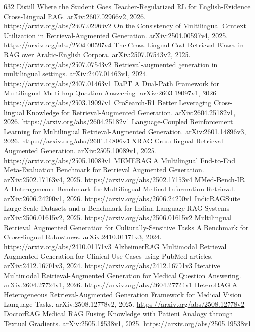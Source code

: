 \documentclass[11pt]{article}
\begin{document}
\begin{thebibliography}{632}
 Distill Where the Student Goes Teacher-Regularized RL for English-Evidence Cross-Lingual RAG. arXiv:2607.02966v2, 2026. \url{https://arxiv.org/abs/2607.02966v2}
 On the Consistency of Multilingual Context Utilization in Retrieval-Augmented Generation. arXiv:2504.00597v4, 2025. \url{https://arxiv.org/abs/2504.00597v4}
 The Cross-Lingual Cost Retrieval Biases in RAG over Arabic-English Corpora. arXiv:2507.07543v2, 2025. \url{https://arxiv.org/abs/2507.07543v2}
 Retrieval-augmented generation in multilingual settings. arXiv:2407.01463v1, 2024. \url{https://arxiv.org/abs/2407.01463v1}
 DaPT A Dual-Path Framework for Multilingual Multi-hop Question Answering. arXiv:2603.19097v1, 2026. \url{https://arxiv.org/abs/2603.19097v1}
 CroSearch-R1 Better Leveraging Cross-lingual Knowledge for Retrieval-Augmented Generation. arXiv:2604.25182v1, 2026. \url{https://arxiv.org/abs/2604.25182v1}
 Language-Coupled Reinforcement Learning for Multilingual Retrieval-Augmented Generation. arXiv:2601.14896v3, 2026. \url{https://arxiv.org/abs/2601.14896v3}
 XRAG Cross-lingual Retrieval-Augmented Generation. arXiv:2505.10089v1, 2025. \url{https://arxiv.org/abs/2505.10089v1}
 MEMERAG A Multilingual End-to-End Meta-Evaluation Benchmark for Retrieval Augmented Generation. arXiv:2502.17163v4, 2025. \url{https://arxiv.org/abs/2502.17163v4}
 MMed-Bench-IR A Heterogeneous Benchmark for Multilingual Medical Information Retrieval. arXiv:2606.24200v1, 2026. \url{https://arxiv.org/abs/2606.24200v1}
 IndicRAGSuite Large-Scale Datasets and a Benchmark for Indian Language RAG Systems. arXiv:2506.01615v2, 2025. \url{https://arxiv.org/abs/2506.01615v2}
 Multilingual Retrieval Augmented Generation for Culturally-Sensitive Tasks A Benchmark for Cross-lingual Robustness. arXiv:2410.01171v3, 2024. \url{https://arxiv.org/abs/2410.01171v3}
 AlzheimerRAG Multimodal Retrieval Augmented Generation for Clinical Use Cases using PubMed articles. arXiv:2412.16701v3, 2024. \url{https://arxiv.org/abs/2412.16701v3}
 Iterative Multimodal Retrieval-Augmented Generation for Medical Question Answering. arXiv:2604.27724v1, 2026. \url{https://arxiv.org/abs/2604.27724v1}
 HeteroRAG A Heterogeneous Retrieval-Augmented Generation Framework for Medical Vision Language Tasks. arXiv:2508.12778v2, 2025. \url{https://arxiv.org/abs/2508.12778v2}
 DoctorRAG Medical RAG Fusing Knowledge with Patient Analogy through Textual Gradients. arXiv:2505.19538v1, 2025. \url{https://arxiv.org/abs/2505.19538v1}

\end{thebibliography}
\end{document}
